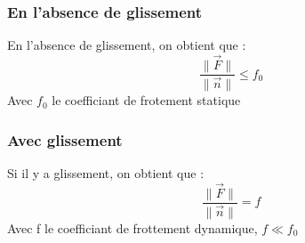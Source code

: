 \subsubsection{En l'absence de glissement}
En l'absence de glissement, on obtient que : 
$$\dfrac{\parallel\overrightarrow{F}\parallel}{\parallel\overrightarrow{n}\parallel}\leq f_0$$
Avec $f_0$ le coefficiant de frotement statique
\subsubsection{Avec glissement}
Si il y a glissement, on obtient que : 
$$\dfrac{\parallel\overrightarrow{F}\parallel}{\parallel\overrightarrow{n}\parallel} =  f$$
Avec f le coefficiant de frottement dynamique, $f\ll f_0$
